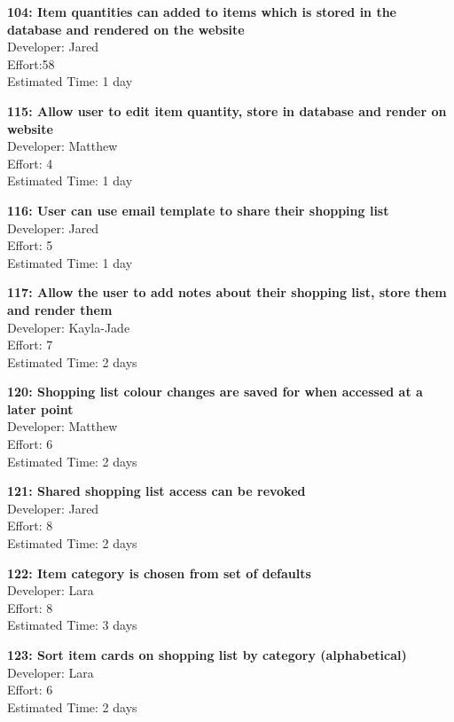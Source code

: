 \documentclass[10pt,onecolumn]{witseiepaper}
\begin{document}
\textbf{104: Item quantities can added to items which is stored in the database and rendered on the website} \\
Developer: Jared\\
Effort:58\\
Estimated Time: 1 day

\textbf{115: Allow user to edit item quantity, store in database and render on website} \\
Developer: Matthew\\
Effort: 4\\
Estimated Time: 1 day

\textbf{116: User can use email template to share their shopping list} \\
Developer: Jared\\
Effort: 5\\
Estimated Time: 1 day
%

\textbf{117: Allow the user to add notes about their shopping list, store them and render them} \\
Developer: Kayla-Jade\\
Effort: 7\\
Estimated Time: 2 days

\textbf{120: Shopping list colour changes are saved for when accessed at a later point} \\
Developer: Matthew\\
Effort: 6\\
Estimated Time: 2 days

\textbf{121: Shared shopping list access can be revoked} \\
Developer: Jared\\
Effort: 8\\
Estimated Time: 2 days

\textbf{122: Item category is chosen from set of defaults} \\
Developer: Lara\\
Effort: 8\\
Estimated Time: 3 days

\textbf{123: Sort item cards on shopping list by category (alphabetical)} \\
Developer: Lara\\
Effort: 6\\
Estimated Time: 2 days
\end{document}
